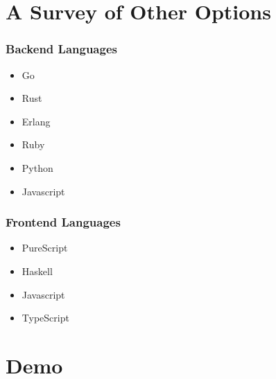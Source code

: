 \documentclass{beamer}
\begin{document}
\section{A Survey of Other Options}

\begin{frame}
  \frametitle{Backend Languages}
  \begin{itemize}
  \item Go
  \item Rust
  \item Erlang
  \item Ruby
  \item Python
  \item Javascript
  \end{itemize}
\end{frame}

\begin{frame}
  \frametitle{Frontend Languages}
  \begin{itemize}
  \item PureScript
  \item Haskell
  \item Javascript
  \item TypeScript
  \end{itemize}
\end{frame}

\section{Demo}
\end{document}
